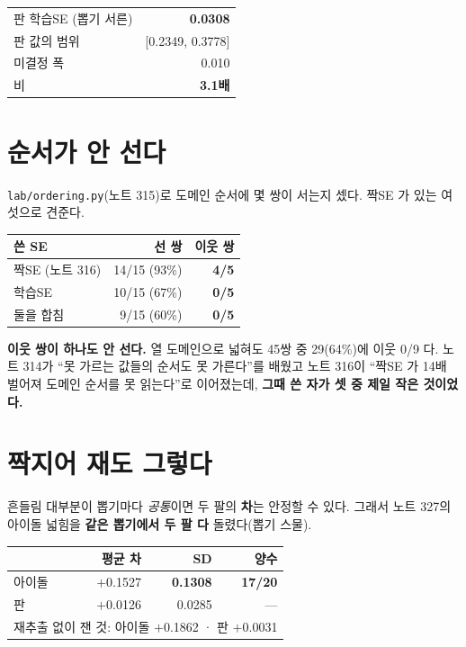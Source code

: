 \documentclass[10pt]{article}
\begin{document}
\begin{center}\small
\begin{tabular}{lr}
\hline
판 학습SE (뽑기 서른) & \textbf{0.0308} \\
판 값의 범위 & [0.2349, 0.3778] \\
미결정 폭 & 0.010 \\
\hline
비 & \textbf{3.1배} \\
\hline
\end{tabular}
\end{center}

\section{순서가 안 선다}

\texttt{lab/ordering.py}(노트 315)로 도메인 순서에 몇 쌍이 서는지 셌다.
짝SE 가 있는 여섯으로 견준다.

\begin{center}\footnotesize
\begin{tabular}{lrr}
\hline
쓴 SE & 선 쌍 & 이웃 쌍 \\
\hline
짝SE (노트 316) & 14/15 (93\%) & \textbf{4/5} \\
학습SE & 10/15 (67\%) & \textbf{0/5} \\
둘을 합침 & 9/15 (60\%) & \textbf{0/5} \\
\hline
\end{tabular}
\end{center}

\textbf{이웃 쌍이 하나도 안 선다.} 열 도메인으로 넓혀도 45쌍 중 29(64\%)에
이웃 0/9 다. 노트 314가 ``못 가르는 값들의 순서도 못 가른다''를 배웠고
노트 316이 ``짝SE 가 14배 벌어져 도메인 순서를 못 읽는다''로 이어졌는데,
\textbf{그때 쓴 자가 셋 중 제일 작은 것이었다.}

\section{짝지어 재도 그렇다}

흔들림 대부분이 뽑기마다 \emph{공통}이면 두 팔의 \textbf{차}는 안정할 수
있다. 그래서 노트 327의 아이돌 넓힘을 \textbf{같은 뽑기에서 두 팔 다}
돌렸다(뽑기 스물).

\begin{center}\footnotesize
\begin{tabular}{lrrr}
\hline
 & 평균 차 & SD & 양수 \\
\hline
아이돌 & $+$0.1527 & \textbf{0.1308} & \textbf{17/20} \\
판 & $+$0.0126 & 0.0285 & --- \\
\hline
\multicolumn{4}{l}{재추출 없이 잰 것: 아이돌 $+$0.1862 · 판 $+$0.0031} \\
\hline
\end{tabular}
\end{center}
\end{document}
